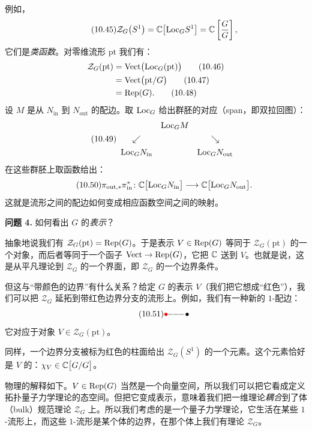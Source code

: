 例如，
\begin{equation}\tag{10.45}
\mathcal{Z}_G\big(S^1\big)=\mathbb{C}\big[\mathrm{Loc}_G S^1\big]=\mathbb{C}\left[\frac{G}{G}\right],
\end{equation}
它们是\emph{类函数}。对零维流形 $\mathrm{pt}$ 我们有：
\begin{align}
\mathcal{Z}_G(\mathrm{pt})&=\mathrm{Vect}\big(\mathrm{Loc}_G(\mathrm{pt})\big)\tag{10.46}\\
&=\mathrm{Vect}\big(\mathrm{pt}/G\big)\tag{10.47}\\
&=\mathrm{Rep}(G).\tag{10.48}
\end{align}
设 $M$ 是从 $N_{\mathrm{in}}$ 到 $N_{\mathrm{out}}$ 的配边。取 $\mathrm{Loc}_G$ 给出群胚的对应（span，即双拉回图）：
\begin{equation}\tag{10.49}
\begin{array}{ccc}
& \mathrm{Loc}_G M &\\[4pt]
\swarrow & & \searrow\\[4pt]
\mathrm{Loc}_G N_{\mathrm{in}} & & \mathrm{Loc}_G N_{\mathrm{out}}
\end{array}
\end{equation}
在这些群胚上取函数给出：
\begin{equation}\tag{10.50}
\pi_{\mathrm{out},*}\pi_{\mathrm{in}}^{*}\colon \mathbb{C}\big[\mathrm{Loc}_G N_{\mathrm{in}}\big]\longrightarrow\mathbb{C}\big[\mathrm{Loc}_G N_{\mathrm{out}}\big].
\end{equation}
这就是流形之间的配边如何变成相应函数空间之间的映射。

\textbf{问题 4.} 如何看出 $G$ 的\emph{表示}？

抽象地说我们有 $\mathcal{Z}_G(\mathrm{pt})=\mathrm{Rep}(G)$。于是表示 $V\in\mathrm{Rep}(G)$ 等同于 $\mathcal{Z}_G(\mathrm{pt})$ 的一个对象，而后者等同于一个函子 $\mathrm{Vect}\to\mathrm{Rep}(G)$，它把 $\mathbb{C}$ 送到 $V$。也就是说，这是从平凡理论到 $\mathcal{Z}_G$ 的一个界面，即 $\mathcal{Z}_G$ 的一个边界条件。

但这与“带颜色的边界”有什么关系？给定 $G$ 的表示 $V$（我们把它想成“红色”），我们可以把 $\mathcal{Z}_G$ 延拓到带红色边界分支的流形上。例如，我们有一种新的 $1$-配边：
\begin{equation}\tag{10.51}
\textcolor{red}{\bullet}\!\!-\!\!-\!\!-\!\bullet
\end{equation}
它对应于对象 $V\in\mathcal{Z}_G(\mathrm{pt})$。

同样，一个边界分支被标为红色的柱面给出 $\mathcal{Z}_G(S^1)$ 的一个元素。这个元素恰好是 $V$ 的：$\chi_V\in\mathbb{C}\big[G/G\big]$。

物理的解释如下。$V\in\mathrm{Rep}(G)$ 当然是一个向量空间，所以我们可以把它看成定义拓扑量子力学理论的态空间。但把它变成表示，意味着我们把一维理论\emph{耦合}到了体（bulk）规范理论 $\mathcal{Z}_G$ 上。所以我们考虑的是一个量子力学理论，它生活在某些 $1$-流形上，而这些 $1$-流形是某个体的边界，在那个体上我们有理论 $\mathcal{Z}_G$。

